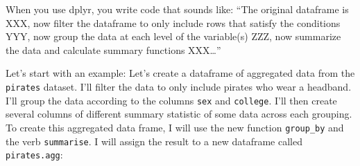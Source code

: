 \documentclass[]{book}
\newenvironment{Shaded}{\begin{snugshade}}{\end{snugshade}}
\newcommand{\KeywordTok}[1]{\textcolor[rgb]{0.13,0.29,0.53}{\textbf{#1}}}
\newcommand{\DataTypeTok}[1]{\textcolor[rgb]{0.13,0.29,0.53}{#1}}
\newcommand{\StringTok}[1]{\textcolor[rgb]{0.31,0.60,0.02}{#1}}
\newcommand{\CommentTok}[1]{\textcolor[rgb]{0.56,0.35,0.01}{\textit{#1}}}
\newcommand{\OperatorTok}[1]{\textcolor[rgb]{0.81,0.36,0.00}{\textbf{#1}}}
\newcommand{\NormalTok}[1]{#1}
\theoremstyle{definition}
\theoremstyle{definition}
\theoremstyle{remark}
\begin{document}
When you use dplyr, you write code that sounds like: ``The original
dataframe is XXX, now filter the dataframe to only include rows that
satisfy the conditions YYY, now group the data at each level of the
variable(s) ZZZ, now summarize the data and calculate summary functions
XXX\ldots{}''

Let's start with an example: Let's create a dataframe of aggregated data
from the \texttt{pirates} dataset. I'll filter the data to only include
pirates who wear a headband. I'll group the data according to the
columns \texttt{sex} and \texttt{college}. I'll then create several
columns of different summary statistic of some data across each
grouping. To create this aggregated data frame, I will use the new
function \texttt{group\_by} and the verb \texttt{summarise}. I will
assign the result to a new dataframe called \texttt{pirates.agg}:

\begin{Shaded}
\end{Shaded}
\end{document}
